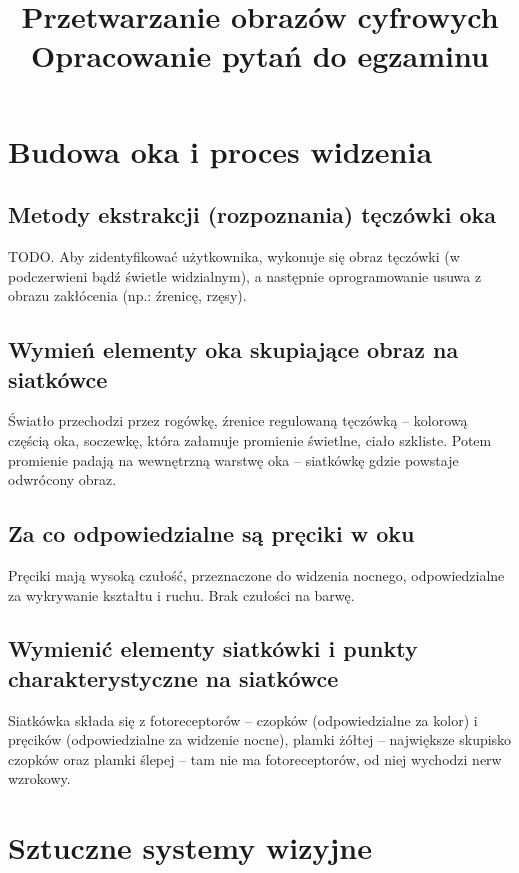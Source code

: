 \documentclass[a4paper, 12pt, titlepage]{article}
\title{Przetwarzanie obrazów cyfrowych\\
	Opracowanie pytań do egzaminu}
\begin{document}
\maketitle
\tableofcontents
\pagebreak
    
    
\pagebreak\section{Budowa oka i proces widzenia}

\subsection{Metody ekstrakcji (rozpoznania) tęczówki oka}
TODO. Aby zidentyfikować użytkownika, wykonuje się obraz tęczówki (w podczerwieni bądź świetle widzialnym), a następnie oprogramowanie usuwa z obrazu zakłócenia (np.: źrenicę, rzęsy). 

\subsection{Wymień elementy oka skupiające obraz na siatkówce}
Światło przechodzi przez rogówkę, źrenice regulowaną tęczówką – kolorową częścią oka, soczewkę, która załamuje promienie świetlne, ciało szkliste. Potem promienie padają na wewnętrzną warstwę oka – siatkówkę gdzie powstaje odwrócony obraz.

\subsection{Za co odpowiedzialne są pręciki w oku}
Pręciki mają wysoką czułość, przeznaczone do widzenia nocnego, odpowiedzialne za wykrywanie kształtu i ruchu. Brak czułości na barwę.

\subsection{Wymienić elementy siatkówki i punkty charakterystyczne na siatkówce}
Siatkówka składa się z fotoreceptorów – czopków (odpowiedzialne za kolor) i pręcików (odpowiedzialne za widzenie nocne), plamki żółtej – największe skupisko czopków oraz plamki ślepej – tam nie ma fotoreceptorów, od niej wychodzi nerw wzrokowy.

\pagebreak\section{Sztuczne systemy wizyjne}
\end{document}
